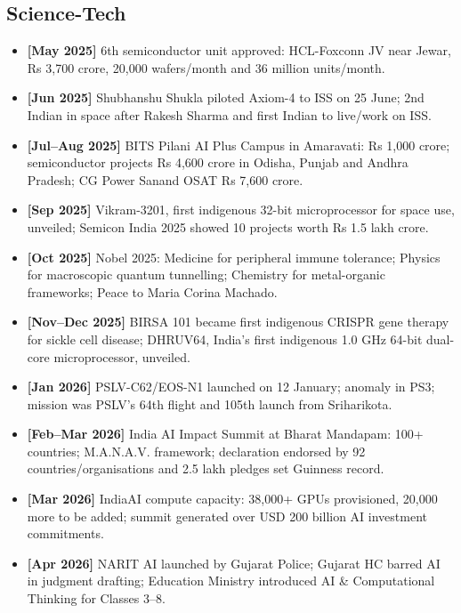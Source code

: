 \documentclass[10pt,a4paper]{article}
\newcommand{\monthtag}[1]{\textbf{[#1]}}
\newcommand{\fact}[2]{\item \monthtag{#1} #2}
\begin{document}
\subsection{Science-Tech}
\begin{itemize}
    \fact{May 2025}{6th semiconductor unit approved: HCL-Foxconn JV near Jewar, Rs 3,700 crore, 20,000 wafers/month and 36 million units/month.}
    \fact{Jun 2025}{Shubhanshu Shukla piloted Axiom-4 to ISS on 25 June; 2nd Indian in space after Rakesh Sharma and first Indian to live/work on ISS.}
    \fact{Jul--Aug 2025}{BITS Pilani AI Plus Campus in Amaravati: Rs 1,000 crore; semiconductor projects Rs 4,600 crore in Odisha, Punjab and Andhra Pradesh; CG Power Sanand OSAT Rs 7,600 crore.}
    \fact{Sep 2025}{Vikram-3201, first indigenous 32-bit microprocessor for space use, unveiled; Semicon India 2025 showed 10 projects worth Rs 1.5 lakh crore.}
    \fact{Oct 2025}{Nobel 2025: Medicine for peripheral immune tolerance; Physics for macroscopic quantum tunnelling; Chemistry for metal-organic frameworks; Peace to Maria Corina Machado.}
    \fact{Nov--Dec 2025}{BIRSA 101 became first indigenous CRISPR gene therapy for sickle cell disease; DHRUV64, India's first indigenous 1.0 GHz 64-bit dual-core microprocessor, unveiled.}
    \fact{Jan 2026}{PSLV-C62/EOS-N1 launched on 12 January; anomaly in PS3; mission was PSLV's 64th flight and 105th launch from Sriharikota.}
    \fact{Feb--Mar 2026}{India AI Impact Summit at Bharat Mandapam: 100+ countries; M.A.N.A.V. framework; declaration endorsed by 92 countries/organisations and 2.5 lakh pledges set Guinness record.}
    \fact{Mar 2026}{IndiaAI compute capacity: 38,000+ GPUs provisioned, 20,000 more to be added; summit generated over USD 200 billion AI investment commitments.}
    \fact{Apr 2026}{NARIT AI launched by Gujarat Police; Gujarat HC barred AI in judgment drafting; Education Ministry introduced AI \& Computational Thinking for Classes 3--8.}
\end{itemize}
\end{document}

